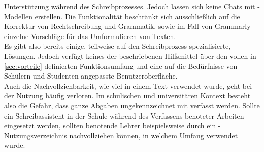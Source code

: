 \documentclass[../main.tex]{subfiles}
\begin{document}
Unterstützung während des Schreibprozesses. Jedoch lassen sich keine Chats mit -Modellen erstellen. Die Funktionalität beschränkt sich ausschließlich auf die Korrektur von 
Rechtschreibung und Grammatik, sowie im Fall von Grammarly einzelne Vorschläge für das Umformulieren von Texten.\cite{microsoftword,grammarly}\\
Es gibt also bereits einige, teilweise auf den Schreibprozess spezialisierte, -Lösungen. Jedoch verfügt keines der beschriebenen Hilfsmittel über den vollen in \autoref{sec:vorteile}
definierten Funktionsumfang und eine auf die Bedürfnisse von Schülern und Studenten angepasste Benutzeroberfläche.\\
Auch die Nachvollziehbarkeit, wie viel  in einem Text verwendet 
wurde, geht bei der Nutzung häufig verloren. Im schulischen und universitären Kontext besteht also die Gefahr, dass ganze Abgaben ungekennzeichnet mit  verfasst werden. Sollte ein 
Schreibassistent in der Schule während des Verfassens benoteter Arbeiten eingesetzt werden, sollten benotende Lehrer beispielsweise durch ein -Nutzungsverzeichnis 
nachvollziehen können, in welchem Umfang  verwendet wurde.
\end{document}
